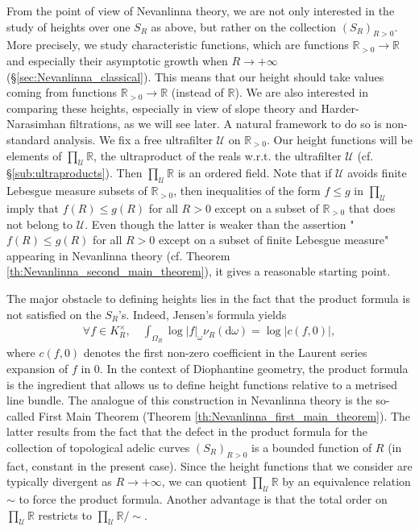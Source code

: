 \documentclass [11pt,reqno]{amsart}
\def\bR{{\mathbb{R}}}
\newcommand{\1}{\mathmybb{1}}
\def\cU{{\mathcal{U}}}
\def\diff{\mathrm{d}}
\begin{document}
From the point of view of Nevanlinna theory, we are not only interested in the study of heights over one $S_{R}$ as above, but rather on the collection $(S_{R})_{R>0}$. More precisely, we study characteristic functions, which are functions $\bR_{>0}\to\bR$ and especially their asymptotic growth when $R\to+\infty$ (\S \ref{sec:Nevanlinna_classical}). This means that our height should take values coming from functions $\bR_{>0}\to\bR$ (instead of $\bR$). We are also interested in comparing these heights, especially in view of slope theory and Harder-Narasimhan filtrations, as we will see later. A natural framework to do so is non-standard analysis. We fix a free ultrafilter $\cU$ on $\bR_{>0}$. Our height functions will be elements of $\prod_{\cU}\bR$, the ultraproduct of the reals w.r.t. the ultrafilter $\cU$ (cf. \S \ref{sub:ultraproducts}). Then $\prod_{\cU}\bR$ is an ordered field. Note that if $\cU$ avoids finite Lebesgue measure subsets of $\bR_{>0}$, then inequalities of the form $f\leq g$ in $\prod_{\cU}$ imply that $f(R)\leq g(R)$ for all $R>0$ except on a subset of $\bR_{>0}$ that does not belong to $\cU$. Even though the latter is weaker than the assertion "$f(R)\leq g(R)$ for all $R>0$ except on a subset of finite Lebesgue measure" appearing in Nevanlinna theory (cf. Theorem \ref{th:Nevanlinna_second_main_theorem}), it gives a reasonable starting point. 

The major obstacle to defining heights lies in the fact that the product formula is not satisfied on the $S_{R}$'s. Indeed, Jensen's formula yields
\begin{align*}
\forall f\in K_{R}^{\times}, \quad \int_{\Omega_{R}} \log|f|_{\omega}\nu_{R}(\diff\omega) = \log|c(f,0)|,
\end{align*}
where $c(f,0)$ denotes the first non-zero coefficient in the Laurent series expansion of $f$ in $0$. In the context of Diophantine geometry, the product formula is the ingredient that allows us to define height functions relative to a metrised line bundle. The analogue of this construction in Nevanlinna theory is the so-called First Main Theorem (Theorem \ref{th:Nevanlinna_first_main_theorem}). The latter results from the fact that the defect in the product formula for the collection of topological adelic curves $(S_{R})_{R>0}$ is a bounded function of $R$ (in fact, constant in the present case). Since the height functions that we consider are typically divergent as $R\to+\infty$, we can quotient $\prod_{\cU}\bR$ by an equivalence relation $\sim$ to force the product formula. Another advantage is that the total order on $\prod_{\cU}\bR$ restricts to $\prod_{\cU}\bR/\sim$.   
\end{document}
